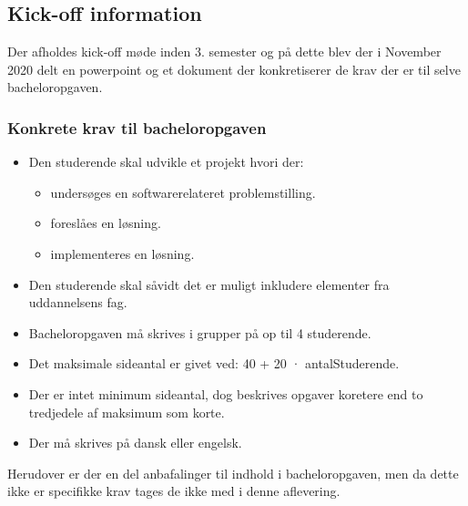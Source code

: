 \newpage
\vspace{0.5cm}
\subsection{Kick-off information}
\label{sec:2.2}

Der afholdes kick-off møde inden 3. semester og på dette blev der i November 2020 delt en powerpoint \cite{sli} og et dokument \cite{pdf} der konkretiserer de krav der er til selve bacheloropgaven. 

\subsubsection{Konkrete krav til bacheloropgaven}
\label{sec:2.2.1}

\begin{itemize}
    \item Den studerende skal udvikle et projekt hvori der:
        \begin{itemize}
            \item undersøges en softwarerelateret problemstilling.
            \item foreslåes en løsning.
            \item implementeres en løsning.
        \end{itemize}
    \item Den studerende skal såvidt det er muligt inkludere elementer fra uddannelsens fag.
    \item Bacheloropgaven må skrives i grupper på op til 4 studerende.
    \item Det maksimale sideantal er givet ved: 40 + 20 · antalStuderende.
    \item Der er intet minimum sideantal, dog beskrives opgaver koretere end to tredjedele af maksimum som korte. 
    \item Der må skrives på dansk eller engelsk. 
\end{itemize}
\vspace{0.5cm}

Herudover er der en del anbafalinger til indhold i bacheloropgaven, men da dette ikke er specifikke krav tages de ikke med i denne aflevering. 